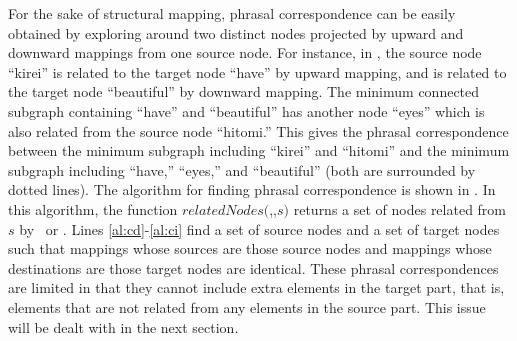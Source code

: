 For the sake of structural mapping, phrasal correspondence can be easily
obtained by exploring around two distinct nodes projected by upward and
downward mappings from one source node. For instance, in ,
the source node ``kirei'' is related to the target node ``have'' by upward
mapping, and is related to the target node ``beautiful'' by downward mapping. 
The minimum connected subgraph containing ``have'' and ``beautiful'' has
another node ``eyes'' which is also related from the source node ``hitomi.'' 
This gives the phrasal correspondence between the minimum subgraph including
``kirei'' and ``hitomi'' and the minimum subgraph including ``have,''
``eyes,'' and ``beautiful'' (both are surrounded by dotted lines).
The algorithm for finding phrasal correspondence is shown in
. In this algorithm, the function 
$relatedNodes($\Mup,\Mdw,$s)$ returns a set of nodes related from $s$ by \Mup\
or \Mdw. Lines \ref{al:cd}-\ref{al:ci} find a set of source nodes and a set
of target nodes such that mappings whose sources are those source nodes and
mappings whose destinations are those target nodes are identical. These
phrasal correspondences are limited in that they cannot include extra elements
in the target part, that is, elements that are not related from any elements
in the source part.  This issue will be dealt with in the next section.

